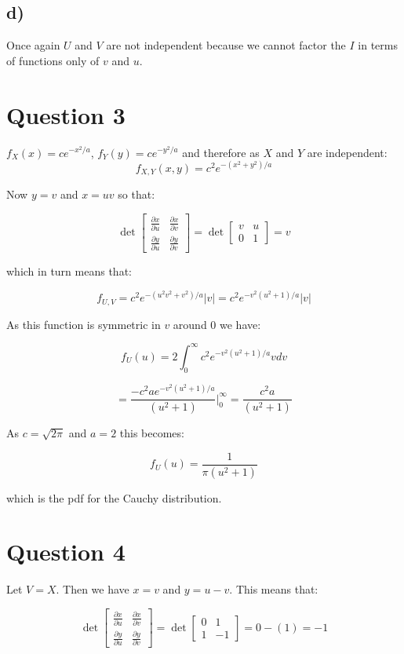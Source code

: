 \documentclass[11pt]{article}
\begin{document}
\subsection*{d)}

Once again $U$ and $V$ are not independent because we cannot factor the $I$ in terms of functions only of $v$ and $u$. 

\section*{Question 3}

$f_X(x) = ce^{-x^2/a}$, $f_Y(y) = ce^{-y^2/a}$ and therefore as $X$ and $Y$ are independent: $$f_{X,Y}(x,y)=c^2e^{-(x^2+y^2)/a}$$

Now $y=v$ and $x=uv$ so that:

$$
\det{\begin{bmatrix}
    \frac{\partial x}{\partial u} & \frac{\partial x}{\partial v} \\
    \frac{\partial y}{\partial u} & \frac{\partial y}{\partial v}
\end{bmatrix}}
=
\det{\begin{bmatrix}
    v & u \\
    0 & 1
\end{bmatrix}}
= v
$$

which in turn means that:

$$f_{U,V} = c^2e^{-(u^2v^2+v^2)/a}|v|=c^2e^{-v^2(u^2+1)/a}|v|$$

As this function is symmetric in $v$ around $0$ we have: 

$$f_U(u) = 2\int_0^{\infty}c^2e^{-v^2(u^2+1)/a}vdv $$

$$=\frac{-c^2ae^{-v^2(u^2+1)/a}}{(u^2+1)}\Big|_0^{\infty}=\frac{c^2a}{(u^2+1)}$$

As $c=\sqrt{2\pi}$ and $a=2$ this becomes:

$$f_U(u) = \frac{1}{\pi(u^2+1)}$$

which is the pdf for the Cauchy distribution.

\section*{Question 4}

Let $V=X$. Then we have $x = v$ and $y= u-v$. This means that:

$$
\det{\begin{bmatrix}
    \frac{\partial x}{\partial u} & \frac{\partial x}{\partial v} \\
    \frac{\partial y}{\partial u} & \frac{\partial y}{\partial v}
\end{bmatrix}}
=
\det{\begin{bmatrix}
    0 & 1 \\
    1 & -1
\end{bmatrix}}
= 0 - (1) = -1
$$
\end{document}
